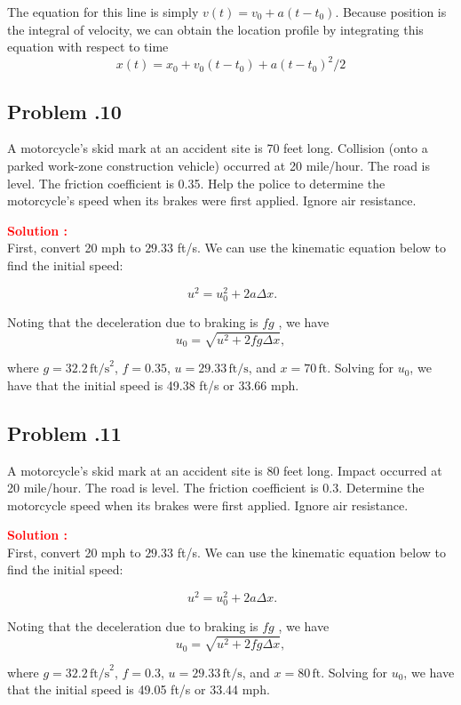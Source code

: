\documentclass[12pt]{article}
\newcommand{\customsubsection}[1]{
  \subsection*{Problem \thesection.#1}
}
\begin{document}
The equation for this line is simply \( v\left(t\right)=v_0+a\left(t-t_0\right) \). Because position is the integral of velocity, we can obtain the location profile by integrating this equation with respect to time
\[
x\left(t\right)=x_0+v_0(t-t_0)+a\left(t-t_0\right)^2/2
\] 

\newpage

\customsubsection{10}
A motorcycle’s skid mark at an accident site is 70 feet long. Collision (onto a parked work-zone construction vehicle) occurred at 20 mile/hour. The road is level. The friction coefficient is 0.35. Help the police to determine the motorcycle’s speed when its brakes were first applied. Ignore air resistance. 


\textbf{\textcolor{red}{Solution :}} \\
First, convert 20 mph to $29.33$ ft/s. We can use the kinematic equation below to find the initial speed:

\[\
u^2 = u_0^2 + 2a\Delta x.
\]

Noting that the deceleration due to braking is $fg$ , we have  
\[
u_0 = \sqrt{u^2 + 2fg \Delta x},
\]

where \(g = 32.2 \, \text{ft/s}^2\), \(f = 0.35\), \(u = 29.33 \, \text{ft/s}\), and \(x = 70 \, \text{ft}\). Solving for \(u_0\), we have that the initial speed is 49.38 ft/s or 33.66 mph.

\newpage


\customsubsection{11}
A motorcycle’s skid mark at an accident site is 80 feet long. Impact occurred at 20 mile/hour. The road is level. The friction coefficient is 0.3. Determine the motorcycle speed when its brakes were first applied. Ignore air resistance.



\textbf{\textcolor{red}{Solution :}} \\
First, convert 20 mph to $ 29.33$ ft/s. We can use the kinematic equation below to find the initial speed:

\[\
u^2 = u_0^2 + 2a\Delta x.
\]

Noting that the deceleration due to braking is $fg$ , we have  
\[
u_0 = \sqrt{u^2 + 2fg \Delta x},
\]

where \(g = 32.2 \, \text{ft/s}^2\), \(f = 0.3\), \(u = 29.33 \, \text{ft/s}\), and \(x = 80 \, \text{ft}\). Solving for \(u_0\), we have that the initial speed is 49.05 ft/s or 33.44 mph.

\newpage
\end{document}
